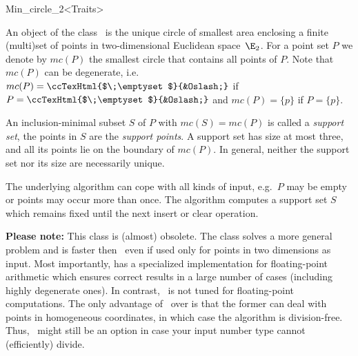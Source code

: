 
\begin{ccRefClass}{Min_circle_2<Traits>}


\ccSaveThreeColumns
\cgalMinCircleLayout

\ccDefinition

An object of the class \ccRefName\ is the unique circle of smallest area
enclosing a finite (multi)set of points in two-dimensional Euclidean
space~$\E_2$.  For a point set $P$ we denote by $mc(P)$ the smallest circle
that contains all points of $P$. Note that $mc(P)$ can be
degenerate,
i.e.~$mc(P)=\mbox{\ccTexHtml{$\;\emptyset$}{&Oslash;}}$ if
$P=\mbox{\ccTexHtml{$\;\emptyset$}{&Oslash;}}$ and $mc(P)=\{p\}$ if
$P=\{p\}$.

An inclusion-minimal subset $S$ of $P$ with $mc(S)=mc(P)$ is called a
\emph{support set},
the points in $S$ are the \emph{support points}.  A support set has size at
most three, and all its points lie on the boundary of $mc(P)$. In general,
neither the support set nor its size are necessarily unique.

The underlying algorithm can cope with all kinds of input, e.g.~$P$ may be
empty or points may occur more than once. The algorithm computes a support
set $S$ which remains fixed until the next insert or clear operation.

{\bf Please note:} This class is (almost) obsolete. The class
 solves a more general problem
and is faster then \ccRefName\, even if used only for points in two
dimensions as input. Most importantly, 
 has
a specialized implementation for floating-point arithmetic which
ensures correct results in a large number of cases (including
highly degenerate ones). In contrast, \ccRefName\ is not tuned for
floating-point computations. The only advantage of 
\ccRefName\ over  is that the
former can deal with points in homogeneous coordinates, in which 
case the algorithm is division-free. Thus, \ccRefName\ might still
be an option in case your input number type cannot (efficiently) 
divide.


\end{ccRefClass}
